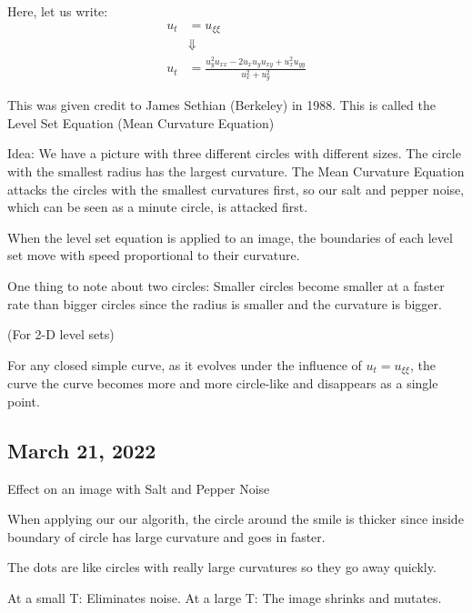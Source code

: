 Here, let us write:
%
\begin{align}
  u_t & = u_{\xi\xi}\\
  & \Downarrow\\
  u_t & = \frac{u^2_y u_{xx} - 2u_x u_y u_{xy} + u^2_x u_{yy}}{u^2_x + u^2_y}
\end{align}

This was given credit to James Sethian (Berkeley) in 1988. This is called the Level Set Equation (Mean Curvature Equation)

Idea: We have a picture with three different circles with different sizes. The circle with the smallest radius has the largest curvature. The Mean Curvature Equation attacks the circles with the smallest curvatures first, so our salt and pepper noise, which can be seen as a minute circle, is attacked first.

When the level set equation is applied to an image, the boundaries of each level set move with speed proportional to their curvature.

One thing to note about two circles: Smaller circles become smaller at a faster rate than bigger circles since the radius is smaller and the curvature is bigger.

 (For 2-D level sets)

For any closed simple curve, as it evolves under the influence of $u_t = u_{\xi \xi}$, the curve the curve becomes more and more circle-like and disappears as a single point.


\subsection*{March 21, 2022}

Effect on an image with Salt and Pepper Noise


When applying our our algorith, the circle around the smile is thicker since inside boundary of circle has large curvature and goes in faster.

The dots are like circles with really large curvatures so they go away quickly.

At a small T: Eliminates noise.
At a large T: The image shrinks and mutates.

